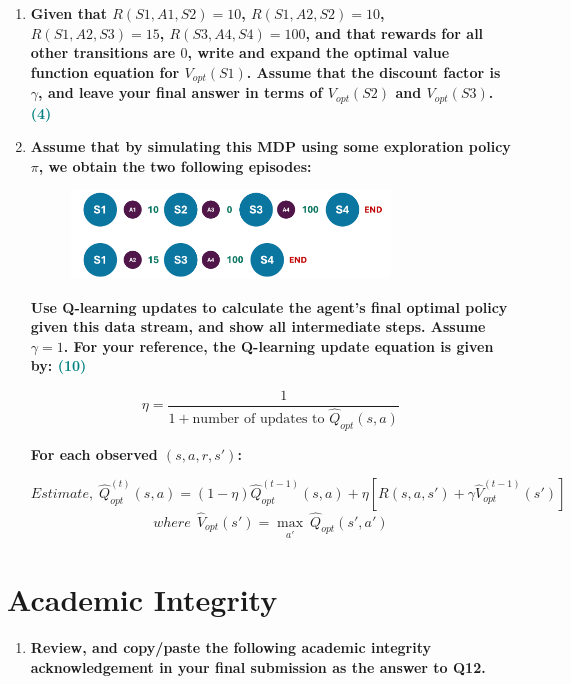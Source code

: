 \documentclass[a4paper]{article}
\begin{document}
\begin{sloppypar}
\begin{enumerate}[start=8,label=Q\arabic*,left=0pt]
    \item \textbf{Given that $R(S1, A1, S2) = 10$, $R(S1, A2, S2) = 10$, $R(S1, A2, S3) = 15$, $R(S3, A4, S4) = 100$, 
    and that rewards for all other transitions are $0$, write and expand the optimal value
    function equation for $V_{opt}(S1)$. Assume that the discount factor is $\gamma$, and leave your final
    answer in terms of $V_{opt}(S2)$ and $V_{opt}(S3)$. \hfill \textcolor{teal}{(4)}}
    
    \par 

    \item \textbf{Assume that by simulating this MDP using some exploration policy $\pi$, we obtain the
    two following episodes:}

    \begin{figure}[H]
        \centering  
        \includegraphics[width=0.8\textwidth]{Q11_mdp.png}
        \label{fig:Q11_mdp}
    \end{figure}

    \textbf{Use Q-learning updates to calculate the agent’s final optimal policy given this data stream,
    and show all intermediate steps. Assume $\gamma = 1$. For your reference, the Q-learning update equation is given by: \hfill \textcolor{teal}{(10)}}
    
    \[ \eta = \frac{1}{1 + \text{number of updates to } \hat{Q}_{opt}(s, a)} \]

    \textbf{For each observed $(s, a, r, s')$:}

    \[ Estimate, \; \hat{Q}^{(t)}_{opt}(s, a) = (1 - \eta) \hat{Q}^{(t-1)}_{opt}(s, a) + \eta[R(s, a, s') + \gamma \hat{V}^{(t-1)}_{opt}(s')] \]
    \[ where \:\: \hat{V}_{opt}(s') = \max_{\substack{a'}} \ \hat{Q}_{opt}(s', a') \]

\end{enumerate}

\section{Academic Integrity}

\begin{enumerate}[start=12,label=Q\arabic*,left=0pt]
    \item \textbf{Review, and copy/paste the following academic integrity acknowledgement in your final submission as the answer to Q12.}
    

\end{enumerate}
\end{sloppypar}
\end{document}
